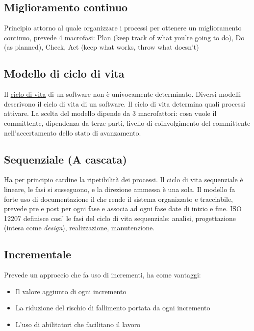 	\subsection{Miglioramento continuo}
	\label{sec:miglioramentocontinuo}
	Principio attorno al quale organizzare i processi per ottenere un miglioramento continuo, prevede 4 macrofasi:
	Plan (keep track of what you're going to do), Do (as planned), Check, Act (keep what works, throw what doesn't)
		
	\subsection{Modello di ciclo di vita}
	\label{sec:modelliciclodivita}
	Il \hyperref[sec:ciclodivita]{ciclo di vita} di un software non è univocamente determinato. Diversi modelli descrivono il ciclo di vita di un software.
	Il ciclo di vita determina quali processi attivare. La scelta del modello dipende da 3 macrofattori: cosa vuole il committente, dipendenza da terze parti, livello di coinvolgimento del committente nell'accertamento dello stato di avanzamento.
	
		\subsection{Sequenziale (A cascata)}
			Ha per principio cardine la ripetibilità dei processi.
			Il ciclo di vita sequenziale è lineare, le fasi si susseguono, e la direzione
			ammessa è una sola.
			Il modello fa forte uso di documentazione il che rende il sistema organizzato e tracciabile, prevede pre e post per ogni fase e associa ad ogni fase date di inizio e fine.  
ISO 12207 definisce cosi' le fasi del ciclo di vita sequenziale: analisi, progettazione (intesa come \textit{design}), realizzazione, manutenzione. 		
		
		\subsection{Incrementale}
			Prevede un approccio che fa uso di incrementi, ha come vantaggi:
			\begin{itemize}  
			\item Il valore aggiunto di ogni incremento 
			\item La riduzione del rischio di fallimento portata da ogni incremento
			\item L'uso di abilitatori che facilitano il lavoro 
			\end{itemize}			
			
